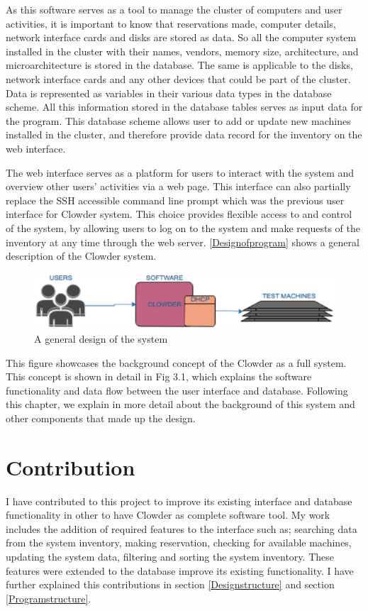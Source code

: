 As this software serves as a tool to manage the cluster of computers and user activities, it is important to know that  reservations made, computer details, network interface cards and disks are stored as data. So all the computer system installed in the cluster with their names, vendors, memory size, architecture, and microarchitecture is stored in the database. The same is applicable to the disks, network interface cards and any other devices that could be part of the cluster. Data is represented as variables in their various data types in the database scheme.  All this information stored in the database tables serves as input  data for the program. This database scheme allows user to add or update new machines installed in the cluster, and therefore provide data record for the inventory on the web interface. 

The web interface serves as a platform for users to interact with the system and overview other users' activities via a web page. This interface can also  partially replace the SSH accessible command line prompt which was the previous user interface for Clowder system. This choice provides flexible access to and control of the system, by allowing users to log on to the system and make requests of the inventory at any time through the web server.
\autoref{Designofprogram} shows a general description of the Clowder system.

\begin{figure}[h]
  \includegraphics[width=\linewidth]{background.eps}
  \caption{A general design of the system}
  \label{Designofprogram}
\end{figure}
\pagebreak

This figure showcases the background concept of the Clowder as a full system. This concept is shown in detail in Fig 3.1, which explains the software functionality and data flow between the user interface and database. Following this chapter, we explain in more detail about the background of this system and other components that made up the design.

\section{Contribution}
I have contributed to this project to improve its existing interface and database functionality in other to have Clowder as complete software tool. My work includes the addition of required features to the interface such as; searching data from the system inventory, making reservation, checking for available machines, updating the system data, filtering and sorting the system inventory. These features were extended to the database improve its existing functionality. I have further explained this contributions in section \ref{Designstructure} and section \ref{Programstructure}.

